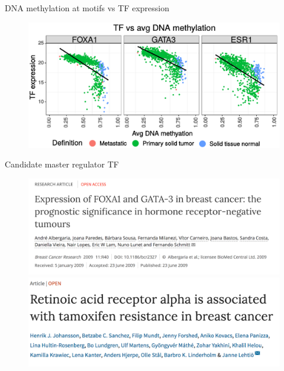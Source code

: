 \documentclass[slidestop,compress,11pt,xcolor=dvipsnames]{beamer}
\begin{document}
\begin{frame}{DNA methylation at motifs vs TF expression}
 \begin{figure}
  \centering
  \includegraphics[width=1.0\linewidth]{ELMER/BRCA_TF_scatter.pdf}
 \end{figure}
\end{frame}


\begin{frame}{Candidate master regulator TF}
 \vspace*{-0.3cm}
 \begin{figure}
  \centering
  \includegraphics[width=0.8\linewidth]{ELMER/paper4.png}\\
  \includegraphics[width=0.8\linewidth]{ELMER/paper2.png}
 \end{figure}
\end{frame}
\end{document}
